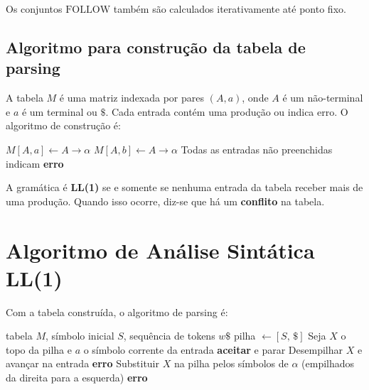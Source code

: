 Os conjuntos \(\mathrm{FOLLOW}\) também são calculados iterativamente
até ponto fixo.

\subsection{Algoritmo para construção da tabela de parsing}

A tabela \(M\) é uma matriz indexada por pares \((A, a)\), onde \(A\)
é um não-terminal e \(a\) é um terminal ou \(\$\). Cada entrada
contém uma produção ou indica erro. O algoritmo de construção é:
\begin{algorithm}
  \begin{algorithmic}[1]
    \State $M[A, a] \gets A \to \alpha$
    \EndFor
    \State $M[A, b] \gets A \to \alpha$
    \EndFor
    \EndIf
    \EndFor
    \State Todas as entradas não preenchidas indicam \textbf{erro}
  \end{algorithmic}
  \caption{Construção da tabela de análise preditiva $M$}
\end{algorithm}

A gramática é \textbf{LL(1)} se e somente se nenhuma entrada da
tabela receber mais de uma produção. Quando isso ocorre, diz-se que
há um \textbf{conflito} na tabela.

\section{Algoritmo de Análise Sintática LL(1)}

Com a tabela construída, o algoritmo de parsing é:

\begin{algorithm}
  \begin{algorithmic}[1]
    \Require tabela $M$, símbolo inicial $S$, sequência de tokens $w\$$
    \State pilha $\gets [S,\,\$]$
    \Loop
    \State Seja $X$ o topo da pilha e $a$ o símbolo corrente da entrada
    \State \textbf{aceitar} e parar
    \State Desempilhar $X$ e avançar na entrada
    \Else
    \State \textbf{erro}
    \EndIf
    \State Substituir $X$ na pilha pelos símbolos de $\alpha$
    \Statex
    \hspace{\algorithmicindent}\hspace{\algorithmicindent}\hspace{\algorithmicindent}(empilhados
    da direita para a esquerda)
    \Else
    \State \textbf{erro}
    \EndIf
    \EndIf
    \EndLoop
  \end{algorithmic}
  \caption{Analisador sintático preditivo dirigido por tabela}
\end{algorithm}

